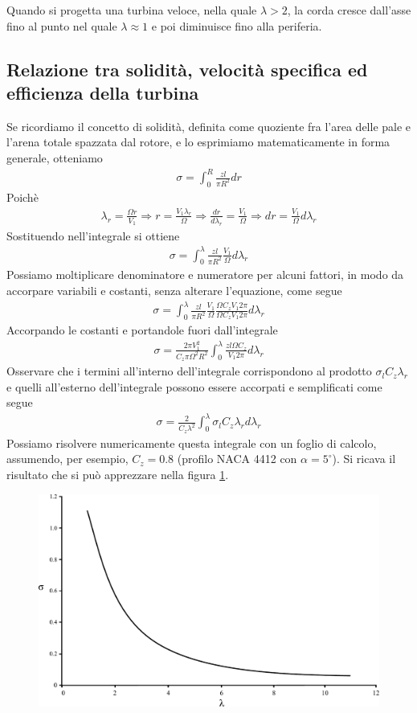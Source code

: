 Quando si progetta una turbina veloce, nella quale $\lambda > 2$, la corda cresce dall'asse fino al punto nel quale $\lambda \approx 1$ e poi diminuisce fino alla periferia. 

\subsection{Relazione tra solidità, velocità specifica ed efficienza della turbina}
Se ricordiamo il concetto di solidità, definita come quoziente fra l'area delle pale e l'arena totale spazzata dal rotore, e lo esprimiamo matematicamente in forma generale, otteniamo
\begin{align*}
\sigma = \int_0^R \frac{z l }{\pi R^2} dr
\end{align*}
Poichè
\begin{align*}
\lambda_r = \frac{\Omega r}{V_1} \Rightarrow r = \frac{V_1 \lambda_r}{\Omega} \Rightarrow \frac{dr}{d \lambda_r} = \frac{V_1}{\Omega} \Rightarrow dr = \frac{V_1}{\Omega} d\lambda_r
\end{align*}
Sostituendo nell'integrale si ottiene
\begin{align*}
\sigma = \int_0^{\lambda} \frac{z l}{\pi R^2} \frac{V_1}{\Omega} d\lambda_r
\end{align*}
Possiamo moltiplicare denominatore e numeratore per alcuni fattori, in modo da accorpare variabili e costanti, senza alterare l'equazione, come segue
\begin{align*}
\sigma = \int_0^{\lambda} \frac{z l}{\pi R^2} \frac{V_1}{\Omega} \frac{\Omega C_z V_1 2 \pi}{\Omega C_z V_1 2 \pi} d \lambda_r
\end{align*}
Accorpando le costanti e portandole fuori dall'integrale
\begin{align*}
\sigma = \frac{2 \pi V_1^2}{C_z \pi \Omega^2 R^2} \int_0^{\lambda} \frac{z l \Omega C_z}{V_1 2 \pi} d \lambda_r
\end{align*}
Osservare che i termini all'interno dell'integrale corrispondono al prodotto $\sigma_l C_z \lambda_r$ e quelli all'esterno dell'integrale possono essere accorpati e semplificati come segue
\begin{align*}
\sigma = \frac{2}{C_z \lambda^2} \int_0^{\lambda} \sigma_l C_z \lambda_r d \lambda_r
\end{align*}
Possiamo risolvere numericamente questa integrale con un foglio di calcolo, assumendo, per esempio, $C_z = 0.8$ (profilo NACA 4412 con $\alpha = 5^\circ$). Si ricava il risultato che si può apprezzare nella figura \ref{fig:sigmalambda}.
\begin{figure}[h!]
\centering
  \includegraphics[width=.7\textwidth]{fig/sigmalambda.pdf}
\caption{}
\label{fig:sigmalambda}
\end{figure}

